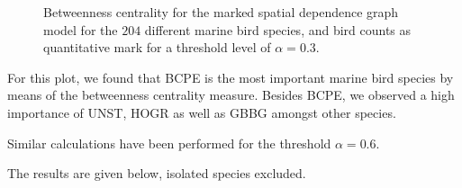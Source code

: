 \documentclass{statsoc}
\begin{document}
\begin{figure}
\centering
{}
      \caption{\label{fig:g30between} Betweenness centrality for the marked spatial dependence graph model for the $204$ different marine bird species, and bird counts as quantitative mark for a threshold level of $\alpha=0.3$.  
 }
\end{figure} 

For this plot, we found that BCPE is the most important marine bird species by means of the betweenness centrality measure. Besides BCPE, we observed a high importance of UNST, HOGR as well as GBBG amongst other species.
 
 
Similar calculations have been performed for the threshold $\alpha=0.6$.



 The results are given below, isolated species excluded.
\end{document}
